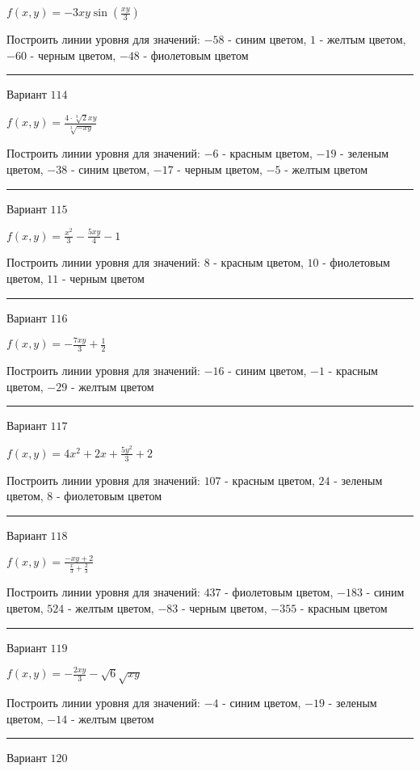 \documentclass[11pt]{report}
\begin{document}
$f(x, y) = - 3 x y \sin{\left(\frac{x y}{3} \right)}$

Построить линии уровня для значений: $-58$ - синим цветом, $1$ - желтым цветом, $-60$ - черным цветом, $-48$ - фиолетовым цветом
\begin{center}
\noindent\rule{8cm}{0.4pt}
\end{center}
Вариант $114$


$f(x, y) = \frac{4 \cdot \sqrt[3]{2} x y}{\sqrt[3]{- x y}}$

Построить линии уровня для значений: $-6$ - красным цветом, $-19$ - зеленым цветом, $-38$ - синим цветом, $-17$ - черным цветом, $-5$ - желтым цветом
\begin{center}
\noindent\rule{8cm}{0.4pt}
\end{center}
Вариант $115$


$f(x, y) = \frac{x^{2}}{3} - \frac{5 x y}{4} - 1$

Построить линии уровня для значений: $8$ - красным цветом, $10$ - фиолетовым цветом, $11$ - черным цветом
\begin{center}
\noindent\rule{8cm}{0.4pt}
\end{center}
Вариант $116$


$f(x, y) = - \frac{7 x y}{3} + \frac{1}{2}$

Построить линии уровня для значений: $-16$ - синим цветом, $-1$ - красным цветом, $-29$ - желтым цветом
\begin{center}
\noindent\rule{8cm}{0.4pt}
\end{center}
Вариант $117$


$f(x, y) = 4 x^{2} + 2 x + \frac{5 y^{2}}{3} + 2$

Построить линии уровня для значений: $107$ - красным цветом, $24$ - зеленым цветом, $8$ - фиолетовым цветом
\begin{center}
\noindent\rule{8cm}{0.4pt}
\end{center}
Вариант $118$


$f(x, y) = \frac{- x y + 2}{\frac{x}{3} + \frac{2}{3}}$

Построить линии уровня для значений: $437$ - фиолетовым цветом, $-183$ - синим цветом, $524$ - желтым цветом, $-83$ - черным цветом, $-355$ - красным цветом
\begin{center}
\noindent\rule{8cm}{0.4pt}
\end{center}
Вариант $119$


$f(x, y) = - \frac{2 x y}{3} - \sqrt{6} \sqrt{x y}$

Построить линии уровня для значений: $-4$ - синим цветом, $-19$ - зеленым цветом, $-14$ - желтым цветом
\begin{center}
\noindent\rule{8cm}{0.4pt}
\end{center}
Вариант $120$
\end{document}

